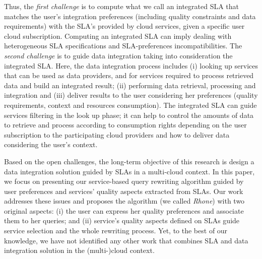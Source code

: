 
Thus, the \textit{first challenge} is to compute what we call an integrated SLA
that matches the user's integration preferences (including quality constraints
and data requirements) with the SLA's provided by cloud services, given a
specific user cloud subscription. Computing an integrated SLA can imply dealing
with heterogeneous SLA specifications and SLA-preferences incompatibilities.
The \textit{second challenge} is to guide data integration taking into
consideration the integrated SLA. Here, the data integration process includes (i) looking up services that can be used as data providers, and for services required to process retrieved data and build an
integrated result; (ii) performing data retrieval, processing and integration
and (iii) deliver results to the user considering her preferences (quality
requirements, context and resources consumption). The integrated SLA can guide
services filtering in the look up phase; it can help to control the amounts of
data to retrieve and process according to consumption rights depending on the
user subscription to the participating cloud providers and how to deliver data
considering the user's context.          


Based on the open challenges, the long-term objective of this research is design a data integration solution guided by SLAs in a multi-cloud context. In this paper, we focus on presenting our service-based query rewriting algorithm guided by user preferences and services' quality aspects extracted from SLAs. Our work addresses these issues and proposes the algorithm (we called \textit{Rhone}) with two original aspects: (i) the user can express her
quality preferences and associate them to her queries; and (ii)  service's quality aspects defined on SLAs guide service selection and the whole rewriting process.
Yet, to the best of our knowledge, we have not identified any other work that combines SLA and data integration solution in the (multi-)cloud context.

